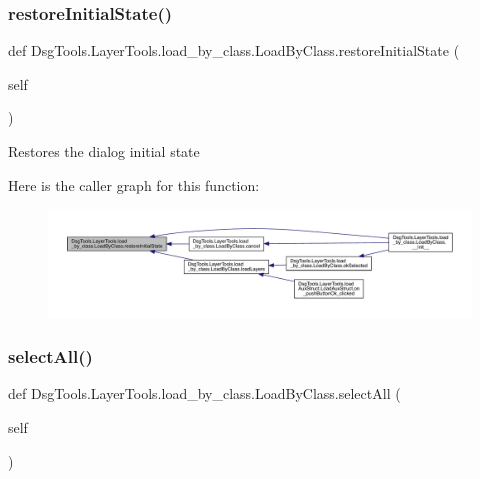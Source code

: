 \subsubsection{\texorpdfstring{restore\+Initial\+State()}{restoreInitialState()}}
{\footnotesize\ttfamily def Dsg\+Tools.\+Layer\+Tools.\+load\+\_\+by\+\_\+class.\+Load\+By\+Class.\+restore\+Initial\+State (\begin{DoxyParamCaption}\item[{}]{self }\end{DoxyParamCaption})}

\begin{DoxyVerb}Restores the dialog initial state
\end{DoxyVerb}
 Here is the caller graph for this function\+:
\nopagebreak
\begin{figure}[H]
\begin{center}
\leavevmode
\includegraphics[width=350pt]{class_dsg_tools_1_1_layer_tools_1_1load__by__class_1_1_load_by_class_a2d4794f6c8dae759b5818bede495cc20_icgraph}
\end{center}
\end{figure}
\mbox{\label{class_dsg_tools_1_1_layer_tools_1_1load__by__class_1_1_load_by_class_a6d48fb9212088fb024f0de2b056f50c7}} 
\subsubsection{\texorpdfstring{select\+All()}{selectAll()}}
{\footnotesize\ttfamily def Dsg\+Tools.\+Layer\+Tools.\+load\+\_\+by\+\_\+class.\+Load\+By\+Class.\+select\+All (\begin{DoxyParamCaption}\item[{}]{self }\end{DoxyParamCaption})}

